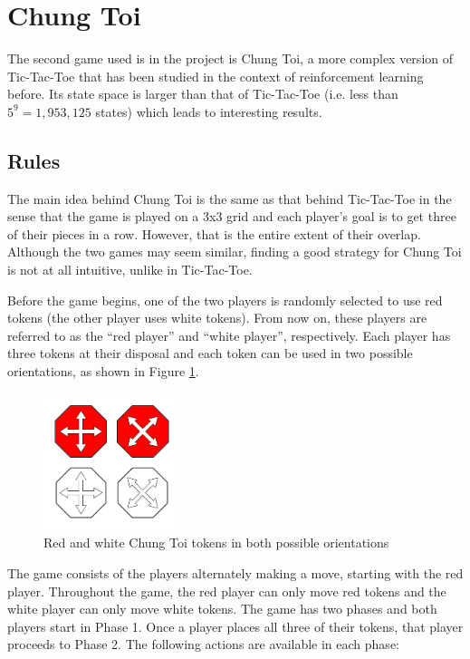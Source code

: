\documentclass[11pt,a4paper]{report}
\begin{document}
\section{Chung Toi}

The second game used is in the project is Chung Toi,  a more complex version of Tic-Tac-Toe that has been studied in the context of reinforcement learning before. Its state space is larger than that of Tic-Tac-Toe (i.e. less than $5^9 = 1,953,125$ states) which leads to interesting results.


\subsection{Rules}

The main idea behind Chung Toi is the same as that behind Tic-Tac-Toe in the sense that the game is played on a 3x3 grid and each player's goal is to get three of their pieces in a row. However, that is the entire extent of their overlap. Although the two games may seem similar, finding a good strategy for Chung Toi is not at all intuitive, unlike in Tic-Tac-Toe.

Before the game begins, one of the two players is randomly selected to use red tokens (the other player uses white tokens). From now on, these players are referred to as the ``red player'' and ``white player'', respectively. Each player has three tokens at their disposal and each token can be used in two possible orientations, as shown in Figure \ref{chung-toi-tokens}.

\begin{figure}[htbp]
	\begin{center}
		\includegraphics[width=40mm]{chung_toi_tokens.png}
		\caption[Chung Toi tokens]{Red and white Chung Toi tokens in both possible orientations}\label{chung-toi-tokens}
	\end{center}
\end{figure}

The game consists of the players alternately making a move, starting with the red player. Throughout the game, the red player can only move red tokens and the white player can only move white tokens. The game has two phases and both players start in Phase 1. Once a player places all three of their tokens, that player proceeds to Phase 2. The following actions are available in each phase:
\end{document}
